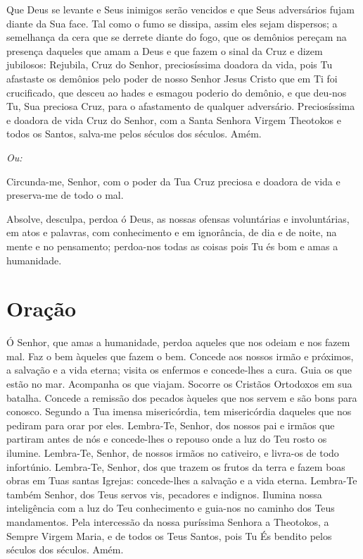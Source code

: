 \documentclass{subfiles}
\begin{document}
Que Deus se levante e Seus inimigos serão vencidos e que Seus adversários fujam
diante da Sua face. Tal como o fumo se dissipa, assim eles sejam dispersos; a
semelhança da cera que se derrete diante do fogo, que os demônios pereçam na
presença daqueles que amam a Deus e que fazem o sinal da Cruz e dizem jubilosos:
Rejubila, Cruz do Senhor, preciosíssima doadora da vida, pois Tu afastaste os
demônios pelo poder de nosso Senhor Jesus Cristo que em Ti foi crucificado, que
desceu ao hades e esmagou poderio do demônio, e que deu-nos Tu, Sua preciosa
Cruz, para o afastamento de qualquer adversário. Preciosíssima e doadora de vida
Cruz do Senhor, com a Santa Senhora Virgem Theotokos e todos os Santos, salva-me
pelos séculos dos séculos. Amém.

\textit{Ou:}

Circunda-me, Senhor, com o poder da Tua Cruz preciosa e doadora de
vida e preserva-me de todo o mal.


Absolve, desculpa, perdoa ó Deus, as nossas ofensas voluntárias e
involuntárias, em atos e palavras, com conhecimento e em ignorância, de dia
e de noite, na mente e no pensamento; perdoa-nos todas as coisas pois Tu és
bom e amas a humanidade.

\section*{Oração}

Ó Senhor, que amas a humanidade, perdoa aqueles que nos odeiam e nos fazem mal.
Faz o bem àqueles que fazem o bem. Concede aos nossos irmão e próximos, a
salvação e a vida eterna; visita os enfermos e concede-lhes a cura. Guia os que
estão no mar. Acompanha os que viajam. Socorre os Cristãos Ortodoxos em sua
batalha. Concede a remissão dos pecados àqueles que nos servem e são bons para
conosco. Segundo a Tua imensa misericórdia, tem misericórdia daqueles que nos
pediram para orar por eles. Lembra-Te, Senhor, dos nossos pai e irmãos que
partiram antes de nós e concede-lhes o repouso onde a luz do Teu rosto os
ilumine. Lembra-Te, Senhor, de nossos irmãos no cativeiro, e livra-os de todo
infortúnio. Lembra-Te, Senhor, dos que trazem os frutos da terra e fazem boas
obras em Tuas santas Igrejas: concede-lhes a salvação e a vida eterna. Lembra-Te
também Senhor, dos Teus servos vis, pecadores e indignos. Ilumina nossa
inteligência com a luz do Teu conhecimento e guia-nos no caminho dos Teus
mandamentos. Pela intercessão da nossa puríssima Senhora a Theotokos, a Sempre
Virgem Maria, e de todos os Teus Santos, pois Tu És bendito pelos séculos dos
séculos. Amém.
\end{document}
